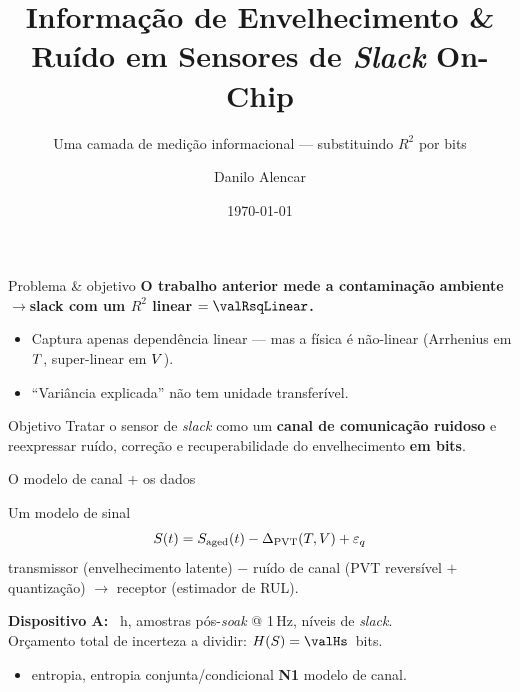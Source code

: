 \documentclass[aspectratio=169,11pt]{beamer}
\title{Informação de Envelhecimento \& Ruído em Sensores de \emph{Slack} On-Chip}
\subtitle{Uma camada de medição informacional --- substituindo $R^2$ por bits}
\author{Danilo Alencar}
\institute{PPGETI / UFC --- Teoria da Informa\c{c}\~ao (TIP7266), Trabalho Final 2026.1}
\date{\today}
\begin{document}
\maketitle

\begin{frame}{Problema \& objetivo}
  \textbf{O trabalho anterior mede a contaminação ambiente$\rightarrow$slack com um $R^2$ linear $= \valRsqLinear$.}
  \begin{itemize}
    \item Captura \alert{apenas} dependência linear --- mas a física é não-linear
          (Arrhenius em $T$, super-linear em $V$).
    \item ``Variância explicada'' \alert{não tem unidade transferível}.
  \end{itemize}
  \vfill
  \begin{block}{Objetivo}
    Tratar o sensor de \emph{slack} como um \textbf{canal de comunicação ruidoso}
    e reexpressar ruído, correção e recuperabilidade do envelhecimento \textbf{em bits}.
  \end{block}
\end{frame}

\begin{frame}{O modelo de canal + os dados}
  \begin{block}{Um modelo de sinal}
    \[ S(t) = S_{\mathrm{aged}}(t) - \Delta_{\mathrm{PVT}}(T,V) + \varepsilon_q \]
    transmissor (envelhecimento latente) $-$ ruído de canal (PVT reversível $+$ quantização)
    $\rightarrow$ receptor (estimador de RUL).
  \end{block}
  \textbf{Dispositivo A:} \valDurationHours~h, \valPostSoakSamples{} amostras pós-\emph{soak} @ 1\,Hz,
  \valSlackLevels{} níveis de \emph{slack}.\\
  Orçamento total de incerteza a dividir: $\Ent{\slk} = \valHs$~bits.
  \begin{itemize}
    \item[\textbf{N2}] entropia, entropia conjunta/condicional \quad
    \textbf{N1} modelo de canal.
  \end{itemize}
\end{frame}
\end{document}
